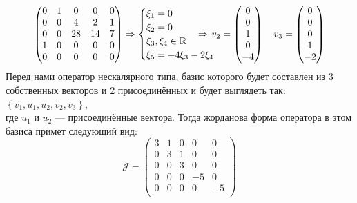 \documentclass{article}
\newcommand{\shiftleft}[3]{\makebox[#1][r]{\makebox[#2][l]{#3}}}
\begin{document}
\begin{center}
$$\begin{pmatrix}
0 & 1 & 0 & 0 & 0 \\
0 & 0 & 4 & 2 & 1 \\
0 & 0 & 28 & 14 & 7 \\
1 & 0 & 0 & 0 & 0 \\
0 & 0 & 0 & 0 & 0 \\
\end{pmatrix} \Rightarrow \begin{cases}
\xi_1 = 0 \\
\xi_2 = 0 \\
\xi_3, \xi_4 \in \mathbb{R} \\
\xi_5 = -4\xi_3-2\xi_4 \\
\end{cases}  \shiftleft{-15pt}{14pt}{$\Rightarrow$} v_2=\begin{pmatrix}
0 \\ 0 \\ 1 \\ 0 \\ -4
\end{pmatrix}\quad v_3 = \begin{pmatrix}
0 \\ 0 \\ 0 \\ 1 \\ -2
\end{pmatrix}$$
Перед нами оператор нескалярного типа, базис которого будет составлен из 3 собственных векторов и 2 присоединённых и будет выглядеть так: $\left\{v_1, u_1, u_2, v_2, v_3\right\}$, \\ где $u_1$ и $u_2$ --- присоединённые вектора. Тогда жорданова форма оператора в этом базиса примет следующий вид:
$$\mathcal{J} = \begin{pmatrix}
3 & 1 & 0 & 0 & 0 \\
0 & 3 & 1 & 0 & 0 \\
0 & 0 & 3 & 0 & 0 \\
0 & 0 & 0 & -5 & 0 \\
0 & 0 & 0 & 0 & -5 \\
\end{pmatrix}$$
\end{center}
\end{document}
